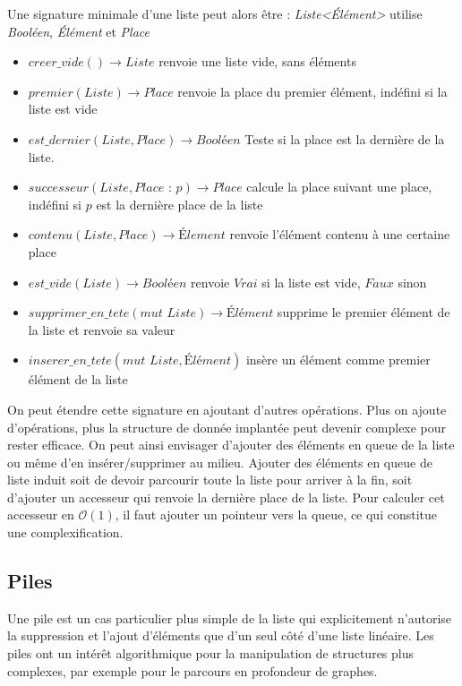 \documentclass[../../../main.tex]{subfiles}
\begin{document}
Une signature minimale d'une liste peut alors être :\newline
\textit{Liste\textless Élément\textgreater} utilise \textit{Booléen}, \textit{Élément} et \textit{Place}
\begin{itemize}
	\item $creer\_vide() \rightarrow Liste$ renvoie une liste vide, sans éléments
	\item $premier(Liste)\rightarrow Place$ renvoie la place du premier élément, indéfini si la liste est vide
	\item $est\_dernier(Liste, Place)\rightarrow \textit{Booléen}$ Teste si la place est la dernière de la liste.
	\item $successeur(Liste, \textit{Place : p})\rightarrow Place$ calcule la place suivant une place, indéfini si $p$ est la dernière place de la liste
	\item $contenu(Liste,Place) \rightarrow \textit{Élement}$ renvoie l'élément contenu à une certaine place
	\item $est\_vide(Liste)\rightarrow \textit{Booléen}$ renvoie $Vrai$ si la liste est vide, $Faux$ sinon
	\item $supprimer\_en\_tete(\textit{mut Liste})\rightarrow \textit{Élément}$ supprime le premier élément de la liste et renvoie sa valeur
	\item $inserer\_en\_tete(\textit{mut Liste}, \textit{Élément})$ insère un élément comme premier élément de la liste
\end{itemize}
On peut étendre cette signature en ajoutant d'autres opérations. Plus on ajoute d'opérations, plus la structure de donnée implantée peut devenir complexe pour rester efficace. On peut ainsi envisager d'ajouter des éléments en queue de la liste ou même d'en insérer/supprimer au milieu. \newline
Ajouter des éléments en queue de liste induit soit de devoir parcourir toute la liste pour arriver à la fin, soit d'ajouter un accesseur qui renvoie la dernière place de la liste. Pour calculer cet accesseur en $\mathcal{O}(1)$, il faut ajouter un pointeur vers la queue, ce qui constitue une complexification.
\subsection{Piles}
Une pile est un cas particulier plus simple de la liste qui explicitement n'autorise la suppression et l'ajout d'éléments que d'un seul côté d'une liste linéaire. Les piles ont un intérêt algorithmique pour la manipulation de structures plus complexes, par exemple pour le parcours en profondeur de graphes.
\end{document}
